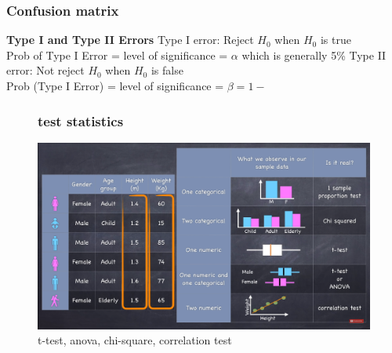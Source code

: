\documentclass{beamer}
\begin{document}
\begin{frame}\frametitle{Confusion matrix}

\end{frame}

{%
	\begin{frame}[plain]
	\vspace{2.5in}
	\textbf{Type I and Type II Errors}
	Type I error: Reject $H_0$ when $H_0$ is true \\
	Prob of Type I Error = level of significance = $\alpha$ which is generally 5\%
	Type II error: Not reject $H_0$ when $H_0$ is false \\
	Prob (Type I Error) = level of significance = $\beta = 1-$ \\
	\end{frame}
}%



\begin{frame}%
\begin{figure}\frametitle{test statistics}
\includegraphics[scale=0.3]{TypesTests} 
\caption{t-test, anova, chi-square, correlation test}
\end{figure}
\end{frame}
\end{document}
